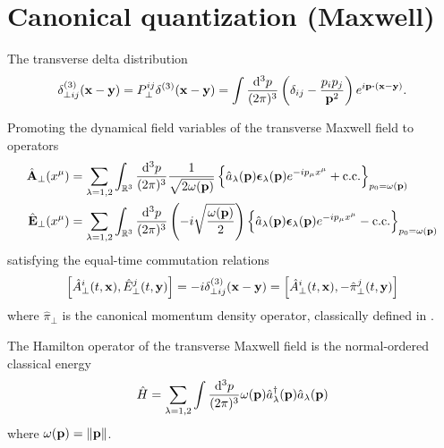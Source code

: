 \section{Canonical quantization (Maxwell)}

\begin{definition}\label{def:delta_distribution_transverse}
	The transverse delta distribution
	\begin{equation}
		\label{eq:delta_distribution_transverse}
		\delta_{\perp ij}^{(3)}(\vb{x}-\vb{y})
		=
		P^{ij}_\perp
		\delta^{(3)}(\vb{x}-\vb{y})
		=
		\int\frac{\dd[3]{p}}{(2\pi)^3}
		\left(
			\delta_{ij}
			-
			\frac{p_ip_j}{\vb{p}^2}
		\right)
		e^{i\vb{p}\vdot(\vb{x}-\vb{y})}
		.
	\end{equation}
\end{definition}
\begin{corollary}\label{thm:qmw_transverse}
	Promoting the dynamical field variables of the transverse Maxwell field to operators
	\begin{align}
		\label{eq:qmw_transverse}
		\hat{\vb{A}}_\perp(x^\mu)
		&=
		\sum_{\lambda=1,2}
		\int_{\mathbb{R}^3}\frac{\dd[3]{p}}{(2\pi)^3}
		\frac{1}{\sqrt{2\omega(\vb{p})}}
		\left\{
			\hat{a}_\lambda(\vb{p})
			\boldsymbol{\epsilon}_\lambda(\vb{p})
			e^{-ip_\mu x^\mu}
			+
			\text{c.c.}
		\right\}_{p_0=\omega(\vb{p})}
		\\
		\hat{\vb{E}}_\perp(x^\mu)
		&=
		\sum_{\lambda=1,2}
		\int_{\mathbb{R}^3}\frac{\dd[3]{p}}{(2\pi)^3}
		\left(
			-i
			\sqrt{\frac{\omega(\vb{p})}{2}}
		\right)
		\left\{
			\hat{a}_\lambda(\vb{p})
			\boldsymbol{\epsilon}_\lambda(\vb{p})
			e^{-ip_\mu x^\mu}
			-
			\text{c.c.}
		\right\}_{p_0=\omega(\vb{p})}
	\end{align}
	satisfying the equal-time commutation relations~\cite[p.~197]{Greiner2013}
	\begin{equation}
		\label{eq:qmw_transverse_comm}
		\comm{\hat{A}_\perp^i(t,\vb{x})}{\hat{E}_\perp^j(t,\vb{y})}
		=
		-i
		\delta_{\perp ij}^{(3)}(\vb{x}-\vb{y})
		=
		\comm{\hat{A}_\perp^i(t,\vb{x})}{-\hat\pi_\perp^j(t,\vb{y})}
	\end{equation}
	where $\hat\pi_\perp$ is the canonical momentum density operator, classically defined in .
\end{corollary}
\begin{definition}\label{thm:qmw_hamilton}
	The Hamilton operator of the transverse Maxwell field is the normal-ordered classical energy
	\begin{equation}
		\label{eq:qmw_hamilton}
		\hat{H}
		=
		\sum_{\lambda=1,2}
		\int\frac{\dd[3]{p}}{(2\pi)^3}
		\omega(\vb{p})
		\hat{a}_\lambda^\dagger(\vb{p})
		\hat{a}_\lambda(\vb{p})
	\end{equation}
	where $\omega(\vb{p})=\norm{\vb{p}}$.
\end{definition}
